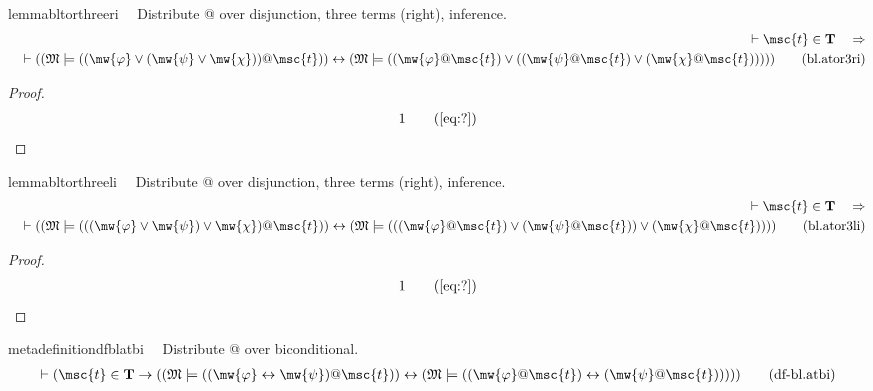 \begin{restatable}{lemma}{bltorthreeri}~~ Distribute @ over disjunction, three
terms (right), inference.
\begin{align}
\vdash \msc{t} \in \mathbf{T}\quad\Rightarrow \notag \\ 
	\quad \vdash ( ( \mathfrak{M}
    \models ( ( \mw{\varphi} \vee ( \mw{\psi} \vee \mw{\chi} ) ) @ \msc{t} ) )
    \leftrightarrow ( \mathfrak{M} \models ( ( \mw{\varphi} @ \msc{t} ) \vee (
    ( \mw{\psi} @ \msc{t} ) \vee ( \mw{\chi} @ \msc{t} ) ) ) )
    )\label{eq:bl.ator3ri}\tag{bl.ator3ri}
\end{align}
\end{restatable}

\begin{proof}
\begin{align}
  1 &&  & &(\mbox{\ref{eq:?}})\notag
\end{align}
\end{proof}

\begin{restatable}{lemma}{bltorthreeli}~~ Distribute @ over disjunction, three
terms (right), inference.
\begin{align}
\vdash \msc{t} \in \mathbf{T}\quad\Rightarrow \notag \\ 
	\quad \vdash ( ( \mathfrak{M}
    \models ( ( ( \mw{\varphi} \vee \mw{\psi} ) \vee \mw{\chi} ) @ \msc{t} ) )
    \leftrightarrow ( \mathfrak{M} \models ( ( ( \mw{\varphi} @ \msc{t} ) \vee
    ( \mw{\psi} @ \msc{t} ) ) \vee ( \mw{\chi} @ \msc{t} ) ) )
    )\label{eq:bl.ator3li}\tag{bl.ator3li}
\end{align}
\end{restatable}

\begin{proof}
\begin{align}
  1 &&  & &(\mbox{\ref{eq:?}})\notag
\end{align}
\end{proof}

\begin{restatable}{metadefinition}{dfblatbi}~~ Distribute @ over biconditional.
\begin{align}
\vdash ( \msc{t} \in \mathbf{T} \rightarrow ( ( \mathfrak{M} \models ( (
    \mw{\varphi} \leftrightarrow \mw{\psi} ) @ \msc{t} ) ) \leftrightarrow (
    \mathfrak{M} \models ( ( \mw{\varphi} @ \msc{t} ) \leftrightarrow (
    \mw{\psi} @ \msc{t} ) ) ) ) )\label{eq:df-bl.atbi}\tag{df-bl.atbi}
\end{align}
\end{restatable}

